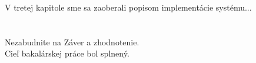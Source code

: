 \documentclass[12pt]{article}
\begin{document}
\noindent
V tretej kapitole sme sa zaoberali popisom implementácie systému...

 

\section*{\lnconclusion} %
Nezabudnite na Záver a zhodnotenie.\\  
Cieľ bakalárskej práce bol splnený.


\newpage
\printbibliography[title={\lnbibliography}]


\end{document}
